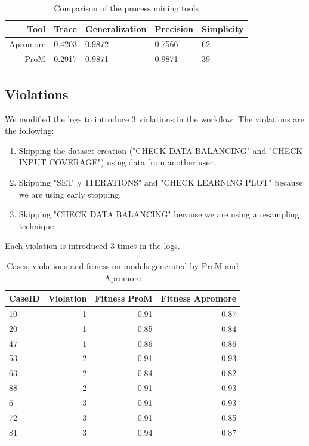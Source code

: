 \begin{table}[H]
\centering
\begin{tabular}{|r|l|l|l|l|}
\hline
\textbf{Tool} & \textbf{Trace} & \textbf{Generalization} & \textbf{Precision} & \textbf{Simplicity} \\
\hline
Apromore & 0.4203 & 0.9872 & 0.7566 & 62 \\
\hline
ProM & 0.2917 & 0.9871 & 0.9871 & 39 \\
\hline
\end{tabular}
\caption{Comparison of the process mining tools}
\label{tab:process_mining_comparison}
\end{table}

\subsection{Violations}
\label{sec:mining_violations}

We modified the logs to introduce 3 violations in the workflow. The
violations are the following:
\begin{enumerate}
    \item Skipping the dataset creation ("CHECK DATA BALANCING"
        and "CHECK INPUT COVERAGE") using data from another user.
    \item Skipping "SET \# ITERATIONS" and "CHECK LEARNING PLOT" because we are
        using early stopping.
    \item Skipping "CHECK DATA BALANCING" because we are using a resampling
        technique.
\end{enumerate}

Each violation is introduced 3 times in the logs.

\begin{table}[H]
\centering
\begin{tabular}{|l|r|r|r|}
\hline
CaseID & Violation & Fitness ProM & Fitness Apromore \\
\hline
10 & 1 & 0.91 & 0.87 \\
\hline
20 & 1 & 0.85 & 0.84 \\
\hline
47 & 1 & 0.86 & 0.86 \\
\hline
53 & 2 & 0.91 & 0.93 \\
\hline
63 & 2 & 0.84 & 0.82 \\
\hline
88 & 2 & 0.91 & 0.93 \\
\hline
6 & 3 & 0.91 & 0.93 \\
\hline
72 & 3 & 0.91 & 0.85 \\
\hline
81 & 3 & 0.94 & 0.87 \\
\hline
\end{tabular}
\caption{Cases, violations and fitness on models generated by ProM and Apromore}
\label{tab:violations}
\end{table}
